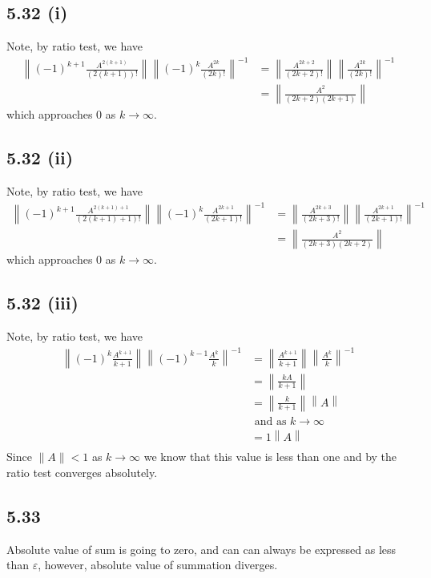 \documentclass[letterpaper,12pt]{article}
\theoremstyle{definition}
\begin{document}
\subsection*{5.32 (i)}
Note, by ratio test, we have
\begin{align*}
    \left\|(-1)^{k+1} \frac{A^{2(k+1)}}{(2(k+1))!} \right\| \left\|(-1)^k \frac{A^{2k}}{(2k)!}\right\|^{-1} 
    & = \left\| \frac{A^{2k+2}}{(2k+2)!}\right\| \left\| \frac{A^{2k}}{(2k)!}\right\|^{-1} \\ 
    &= \left\| \frac{A^{2}}{(2k+2)(2k+1)} \right\|
\end{align*}
which approaches 0 as $k\rightarrow \infty$.
\\
\subsection*{5.32 (ii)}
Note, by ratio test, we have
\begin{align*}
    \left\|(-1)^{k+1} \frac{A^{2(k+1)+1}}{(2(k+1)+1)!} \right\| \left\|(-1)^k \frac{A^{2k+1}}{(2k+1)!}\right\|^{-1} 
    & = \left\| \frac{A^{2k+3}}{(2k+3)!}\right\| \left\| \frac{A^{2k+1}}{(2k+1)!}\right\|^{-1} \\ 
    &= \left\| \frac{A^{2}}{(2k+3)(2k+2)} \right\|
\end{align*}
which approaches 0 as $k\rightarrow \infty$.
\\
\subsection*{5.32 (iii)}
Note, by ratio test, we have
\begin{align*}
    \left\|(-1)^{k} \frac{A^{k+1}}{k+1} \right\| \left\|(-1)^{k-1} \frac{A^{k}}{k}\right\|^{-1} 
    & = \left\|\frac{A^{k+1}}{k+1} \right\| \left\|\frac{A^{k}}{k}\right\|^{-1} \\ 
    &= \left\| \frac{kA}{k+1} \right\|\\
    &= \left\| \frac{k}{k+1} \right\|  \left\|A \right\|\\
&\text{ and as $k \to \infty $}\\
    &= 1  \left\|A \right\|\\
\end{align*}
Since $\|A\| < 1$ as $k\rightarrow \infty$ we know that this value is less than one and by the ratio test converges absolutely.

\subsection*{5.33}
Absolute value of sum is going to zero, and can can always be expressed as less than $\varepsilon$, however, absolute value of summation diverges.\\\\
\end{document}
